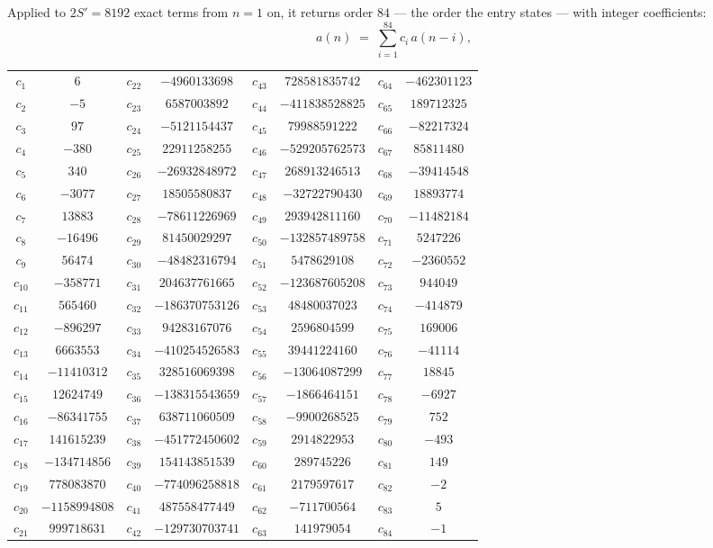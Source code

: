 \documentclass[11pt,a4paper]{article}
\theoremstyle{plain}
\theoremstyle{definition}
\begin{document}
Applied to $2S'=8192$ exact terms from $n=1$ on, it returns order $84$ --- the
order the entry states --- with integer coefficients:
\[
a(n)\;=\;\sum_{i=1}^{84}c_i\,a(n-i),
\]
\begin{center}\small
\begin{tabular}{cccccccc}
$c_{1}$ & $6$ & $c_{22}$ & $-4960133698$ & $c_{43}$ & $728581835742$ & $c_{64}$ & $-462301123$ \\
$c_{2}$ & $-5$ & $c_{23}$ & $6587003892$ & $c_{44}$ & $-411838528825$ & $c_{65}$ & $189712325$ \\
$c_{3}$ & $97$ & $c_{24}$ & $-5121154437$ & $c_{45}$ & $79988591222$ & $c_{66}$ & $-82217324$ \\
$c_{4}$ & $-380$ & $c_{25}$ & $22911258255$ & $c_{46}$ & $-529205762573$ & $c_{67}$ & $85811480$ \\
$c_{5}$ & $340$ & $c_{26}$ & $-26932848972$ & $c_{47}$ & $268913246513$ & $c_{68}$ & $-39414548$ \\
$c_{6}$ & $-3077$ & $c_{27}$ & $18505580837$ & $c_{48}$ & $-32722790430$ & $c_{69}$ & $18893774$ \\
$c_{7}$ & $13883$ & $c_{28}$ & $-78611226969$ & $c_{49}$ & $293942811160$ & $c_{70}$ & $-11482184$ \\
$c_{8}$ & $-16496$ & $c_{29}$ & $81450029297$ & $c_{50}$ & $-132857489758$ & $c_{71}$ & $5247226$ \\
$c_{9}$ & $56474$ & $c_{30}$ & $-48482316794$ & $c_{51}$ & $5478629108$ & $c_{72}$ & $-2360552$ \\
$c_{10}$ & $-358771$ & $c_{31}$ & $204637761665$ & $c_{52}$ & $-123687605208$ & $c_{73}$ & $944049$ \\
$c_{11}$ & $565460$ & $c_{32}$ & $-186370753126$ & $c_{53}$ & $48480037023$ & $c_{74}$ & $-414879$ \\
$c_{12}$ & $-896297$ & $c_{33}$ & $94283167076$ & $c_{54}$ & $2596804599$ & $c_{75}$ & $169006$ \\
$c_{13}$ & $6663553$ & $c_{34}$ & $-410254526583$ & $c_{55}$ & $39441224160$ & $c_{76}$ & $-41114$ \\
$c_{14}$ & $-11410312$ & $c_{35}$ & $328516069398$ & $c_{56}$ & $-13064087299$ & $c_{77}$ & $18845$ \\
$c_{15}$ & $12624749$ & $c_{36}$ & $-138315543659$ & $c_{57}$ & $-1866464151$ & $c_{78}$ & $-6927$ \\
$c_{16}$ & $-86341755$ & $c_{37}$ & $638711060509$ & $c_{58}$ & $-9900268525$ & $c_{79}$ & $752$ \\
$c_{17}$ & $141615239$ & $c_{38}$ & $-451772450602$ & $c_{59}$ & $2914822953$ & $c_{80}$ & $-493$ \\
$c_{18}$ & $-134714856$ & $c_{39}$ & $154143851539$ & $c_{60}$ & $289745226$ & $c_{81}$ & $149$ \\
$c_{19}$ & $778083870$ & $c_{40}$ & $-774096258818$ & $c_{61}$ & $2179597617$ & $c_{82}$ & $-2$ \\
$c_{20}$ & $-1158994808$ & $c_{41}$ & $487558477449$ & $c_{62}$ & $-711700564$ & $c_{83}$ & $5$ \\
$c_{21}$ & $999718631$ & $c_{42}$ & $-129730703741$ & $c_{63}$ & $141979054$ & $c_{84}$ & $-1$ \\
\end{tabular}
\end{center}
\end{document}

